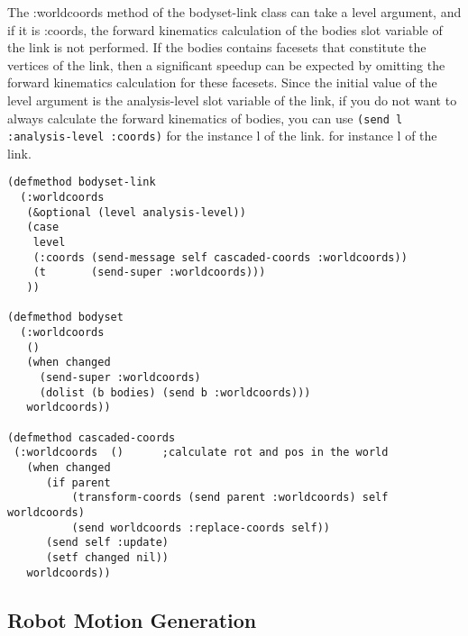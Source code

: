The :worldcoords method of the bodyset-link class can take a level argument, and if it is :coords, the forward kinematics calculation of the bodies slot variable of the link is not performed.
If the bodies contains facesets that constitute the vertices of the link, then a significant speedup can be expected by omitting the forward kinematics calculation for these facesets. Since the initial value of the level argument is the analysis-level slot variable of the link, if you do not want to always calculate the forward kinematics of bodies, you can use \verb|(send l :analysis-level :coords)| for the instance l of the link. for instance l of the link.

{\baselineskip=10pt
\begin{verbatim}
(defmethod bodyset-link
  (:worldcoords
   (&optional (level analysis-level))
   (case
    level
    (:coords (send-message self cascaded-coords :worldcoords))
    (t       (send-super :worldcoords)))
   ))

(defmethod bodyset
  (:worldcoords
   ()
   (when changed
     (send-super :worldcoords)
     (dolist (b bodies) (send b :worldcoords)))
   worldcoords))

(defmethod cascaded-coords
 (:worldcoords  ()      ;calculate rot and pos in the world
   (when changed
      (if parent
          (transform-coords (send parent :worldcoords) self
worldcoords)
          (send worldcoords :replace-coords self))
      (send self :update)
      (setf changed nil))
   worldcoords))
\end{verbatim}
}

\subsection{Robot Motion Generation}



